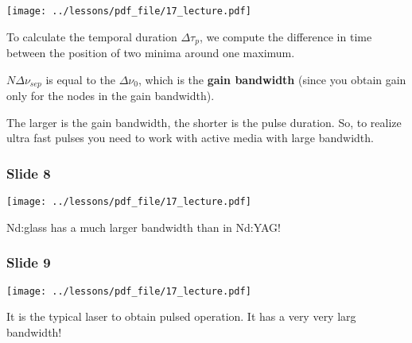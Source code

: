 \documentclass[../main/main.tex]{subfiles}
\begin{document}
\begin{minipage}[]{0.5\linewidth}
\centering
\texttt{[image: ../lessons/pdf\_file/17\_lecture.pdf]}
\end{minipage}
\hspace{0.3cm}\vspace{0.3cm}
\begin{minipage}[c]{0.47\linewidth}

To calculate the temporal duration \( \Delta \tau _p \), we compute the difference in time between the position of two minima around one maximum.

\( N \Delta \nu _{sep} \) is equal to the \( \Delta \nu _0 \), which is the \textbf{gain bandwidth} (since you obtain gain only for the nodes in the gain bandwidth).

The larger is the gain bandwidth, the shorter is the pulse duration. So, to realize ultra fast pulses you need to work with active media with large bandwidth.

\end{minipage}

\subsubsection*{Slide 8}

\begin{minipage}[]{0.5\linewidth}
\centering
\texttt{[image: ../lessons/pdf\_file/17\_lecture.pdf]}
\end{minipage}
\hspace{0.3cm}\vspace{0.3cm}
\begin{minipage}[c]{0.47\linewidth}

Nd:glass has a much larger bandwidth than in Nd:YAG!

\end{minipage}

\subsubsection*{Slide 9}

\begin{minipage}[]{0.5\linewidth}
\centering
\texttt{[image: ../lessons/pdf\_file/17\_lecture.pdf]}
\end{minipage}
\hspace{0.3cm}\vspace{0.3cm}
\begin{minipage}[c]{0.47\linewidth}

It is the typical laser to obtain pulsed operation. It has a very very larg bandwidth!

\end{minipage}
\end{document}
